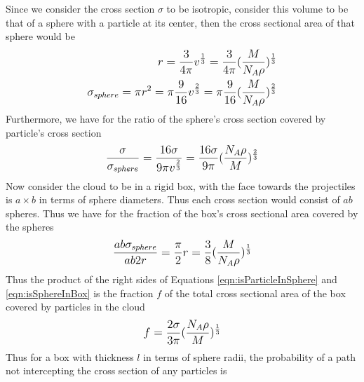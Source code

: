 \documentclass[12pt]{article}
\begin{document}
Since we consider the cross section $\sigma$ to be isotropic, consider this volume to be that of a sphere with a particle at its center, then the cross sectional area of that sphere would be 
\begin{equation}
\begin{split}
\mathlarger{
r = \frac{3}{4\pi}v^{\frac{1}{3}} = \frac{3}{4\pi}(\frac{M}{N_A\rho})^{\frac{1}{3}} 
}\\
\mathlarger{
\sigma_{sphere} = \pi r^2 = \pi\frac{9}{16}v^{\frac{2}{3}} = \pi\frac{9}{16}(\frac{M}{N_A\rho})^{\frac{2}{3}}
}\\
\end{split}
\end{equation}
Furthermore, we have for the ratio of the sphere's cross section covered by particle's cross section 
\begin{equation}\label{eqn:isParticleInSphere}
\begin{split}    
\mathlarger{
\frac{\sigma}{\sigma_{sphere}} = \frac{16\sigma}{9\pi v^{\frac{2}{3}}} = 
\frac{16\sigma}{9\pi}(\frac{N_A\rho}{M})^{\frac{2}{3}}
}\\
\end{split}
\end{equation}
Now consider the cloud to be in a rigid box, with the face towards the projectiles is $a\times b$ in terms of sphere diameters. Thus each cross section would consist of $ab$ spheres. Thus we have for the fraction of the box's cross sectional area covered by the spheres 
\begin{equation}\label{eqn:isSphereInBox}
\begin{split}
\mathlarger{
\frac{ab\sigma_{sphere}}{ab2r} = \frac{\pi}{2} r = \frac{3}{8}(\frac{M}{N_A\rho})^{\frac{1}{3}} 
}\\
\end{split}
\end{equation}
Thus the product of the right sides of Equations \ref{eqn:isParticleInSphere} and \ref{eqn:isSphereInBox} is the fraction $f$ of the total cross sectional area of the box covered by particles in the cloud 
\begin{equation}\label{eqn:isParticleInBox}
\begin{split}
\mathlarger{
f = \frac{2\sigma}{3\pi}(\frac{N_A\rho}{M})^{\frac{1}{3}}
}\\
\end{split}
\end{equation}
Thus for a box with thickness $l$ in terms of sphere radii, the probability of a path not intercepting the cross section of any particles is 
\end{document}
